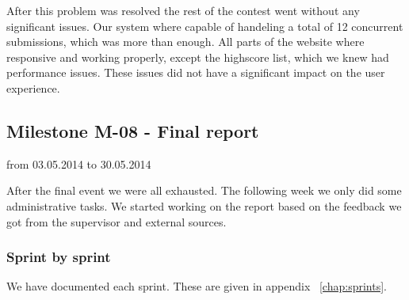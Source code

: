 After this problem was resolved the rest of the contest went without any
significant issues. Our system where capable of handeling a total of 12
concurrent submissions, which was more than enough. All parts of the website where
responsive and working properly, except the highscore list, which we
knew had performance issues. These issues did not have a significant
impact on the user experience.

\pagebreak
\subsection{Milestone M-08 - Final report}
\label{sec:M08}
from 03.05.2014 to 30.05.2014

After the final event we were all exhausted. The following week we only
did some administrative tasks. We started working on the report based on 
the feedback we got from the supervisor and external sources. 

\subsubsection{Sprint by sprint}
We have documented each sprint. These are given in appendix
~\ref{chap:sprints}.
